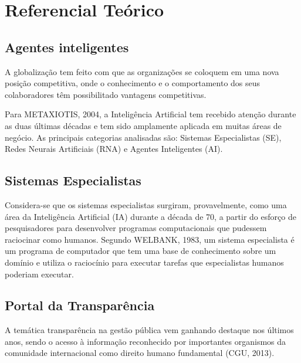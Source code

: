 

\chapter{Referencial Teórico}\label{referencial_teorico}

\section{Agentes inteligentes}

A globalização tem feito com que as organizações se coloquem em uma nova posição competitiva, onde o conhecimento e o comportamento dos seus colaboradores têm possibilitado vantagens competitivas. 

Para METAXIOTIS, 2004, a Inteligência Artificial tem recebido atenção durante as duas últimas décadas e tem sido amplamente aplicada em muitas áreas de negócio. As principais categorias analisadas são: Sistemas Especialistas (SE), Redes Neurais Artificiais (RNA) e Agentes Inteligentes (AI). 

\section{Sistemas Especialistas}

Considera-se que os sistemas especialistas surgiram, provavelmente, como uma área da Inteligência Artificial (IA) durante a década de 70, a partir do esforço de pesquisadores para desenvolver programas computacionais que pudessem raciocinar como humanos. Segundo WELBANK, 1983, um sistema especialista é um programa de computador que tem uma base de conhecimento sobre um domínio e utiliza o raciocínio para executar tarefas que especialistas humanos poderiam executar. 

\section{Portal da Transparência}

A temática transparência na gestão pública vem ganhando destaque nos últimos anos, sendo o acesso à informação reconhecido por importantes organismos da comunidade internacional como direito humano fundamental (CGU, 2013). 